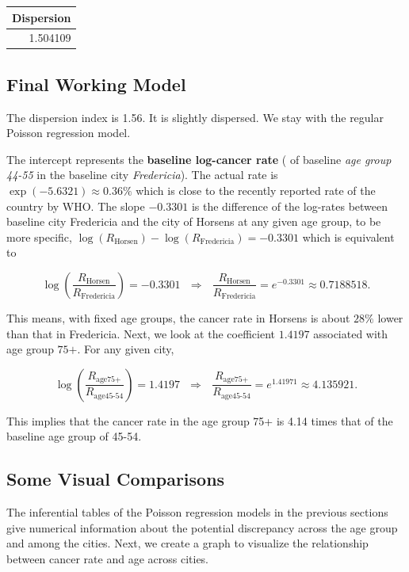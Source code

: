 \documentclass[
]{book}
\begin{document}
\begin{tabular}{r}
\hline
Dispersion\\
\hline
1.504109\\
\hline
\end{tabular}

\hfill\break

\hypertarget{final-working-model}{%
\subsection{Final Working Model}\label{final-working-model}}

The dispersion index is 1.56. It is slightly dispersed. We stay with the regular Poisson regression model.

The intercept represents the \textbf{baseline log-cancer rate} ( of baseline \emph{age group 44-55} in the baseline city \emph{Fredericia}). The actual rate is \(\exp(-5.6321) \approx 0.36\%\) which is close to the recently reported rate of the country by WHO. The slope \(-0.3301\) is the difference of the log-rates between baseline city Fredericia and the city of Horsens at any given age group, to be more specific, \(\log(R_{\text{Horsen}}) - \log(R_{\text{Fredericia}}) = -0.3301\) which is equivalent to

\[
\log \left( \frac{R_{\text{Horsen}}}{R_{\text{Fredericia}}} \right) = -0.3301 ~~~\Rightarrow~~~\frac{R_{\text{Horsen}}}{R_{\text{Fredericia}}} = e^{-0.3301} \approx 0.7188518.
\]

This means, with fixed age groups, the cancer rate in Horsens is about \(28\%\) lower than that in Fredericia. Next, we look at the coefficient \(1.4197\) associated with age group \(\text{75+}\). For any given city,

\[
\log \left(\frac{R_{\text{age75+}}}{R_{\text{age45-54}}} \right) = 1.4197~~~\Rightarrow~~~\frac{R_{\text{age75+}}}{R_{\text{age45-54}}} = e^{1.41971} \approx 4.135921. 
\]

This implies that the cancer rate in the age group 75+ is 4.14 times that of the baseline age group of 45-54.

\hypertarget{some-visual-comparisons}{%
\subsection{Some Visual Comparisons}\label{some-visual-comparisons}}

The inferential tables of the Poisson regression models in the previous sections give numerical information about the potential discrepancy across the age group and among the cities. Next, we create a graph to visualize the relationship between cancer rate and age across cities.
\end{document}
